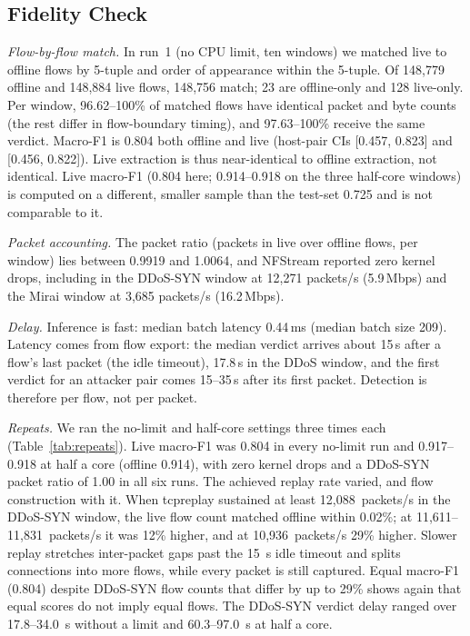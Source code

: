 \subsection{Fidelity Check}\label{sec:fidelity}

\emph{Flow-by-flow match.} In run~1 (no CPU limit, ten windows) we matched live to offline flows by 5-tuple and order of appearance within the 5-tuple. Of 148,779 offline and 148,884 live flows, 148,756 match; 23 are offline-only and 128 live-only. Per window, 96.62--100\% of matched flows have identical packet and byte counts (the rest differ in flow-boundary timing), and 97.63--100\% receive the same verdict. Macro-F1 is 0.804 both offline and live (host-pair CIs [0.457, 0.823] and [0.456, 0.822]). Live extraction is thus near-identical to offline extraction, not identical. Live macro-F1 (0.804 here; 0.914--0.918 on the three half-core windows) is computed on a different, smaller sample than the test-set 0.725 and is not comparable to it.

\emph{Packet accounting.} The packet ratio (packets in live over offline flows, per window) lies between 0.9919 and 1.0064, and NFStream reported zero kernel drops, including in the DDoS-SYN window at 12,271 packets/s (5.9\,Mbps) and the Mirai window at 3,685 packets/s (16.2\,Mbps).

\emph{Delay.} Inference is fast: median batch latency 0.44\,ms (median batch size 209). Latency comes from flow export: the median verdict arrives about 15\,s after a flow's last packet (the idle timeout), 17.8\,s in the DDoS window, and the first verdict for an attacker pair comes 15--35\,s after its first packet. Detection is therefore per flow, not per packet.

\emph{Repeats.} We ran the no-limit and half-core settings three times each (Table~\ref{tab:repeats}). Live macro-F1 was 0.804 in every no-limit run and 0.917--0.918 at half a core (offline 0.914), with zero kernel drops and a DDoS-SYN packet ratio of 1.00 in all six runs. The achieved replay rate varied, and flow construction with it. When tcpreplay sustained at least 12,088~packets/s in the DDoS-SYN window, the live flow count matched offline within 0.02\%; at 11,611--11,831~packets/s it was 12\% higher, and at 10,936~packets/s 29\% higher. Slower replay stretches inter-packet gaps past the 15~s idle timeout and splits connections into more flows, while every packet is still captured. Equal macro-F1 (0.804) despite DDoS-SYN flow counts that differ by up to 29\% shows again that equal scores do not imply equal flows. The DDoS-SYN verdict delay ranged over 17.8--34.0~s without a limit and 60.3--97.0~s at half a core.

